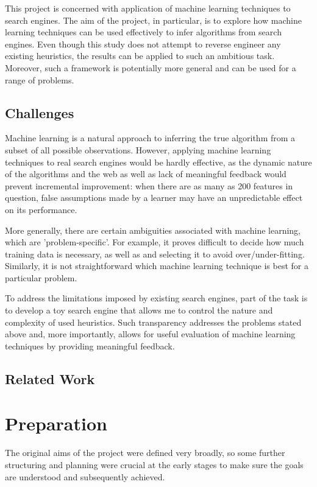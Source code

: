 \documentclass[12pt,notitlepage,twoside]{scrreprt}
\begin{document}
This project is concerned with application of machine learning techniques to
search engines. The aim of the project, in particular,  is to explore how
machine learning techniques can be used effectively to infer algorithms from
search engines. 
Even though this study does not attempt to reverse engineer any existing
heuristics, the results can be applied to such an ambitious task.
Moreover, such a framework is potentially more general and can be used for a
range of problems.

\section{Challenges}
Machine learning is a natural approach to inferring the true algorithm from a
subset of all possible observations. However, applying machine learning
techniques to real search engines would be hardly effective, as the dynamic
nature of the algorithms and the web as well as lack of meaningful feedback
would prevent incremental improvement: when there are as many as 200 features
in question, false assumptions made by a learner may have an unpredictable
effect on its performance.

More generally, there are certain ambiguities associated with machine learning,
which are 'problem-specific'. For example, it proves difficult to decide how
much training data is necessary, as well as and selecting it to avoid
over/under-fitting\cite{domingos}. Similarly, it is not straightforward which
machine learning technique is best for a particular problem.

To address the limitations imposed by existing search engines,
part of the task is to develop a toy search engine that allows me to control
the nature and complexity of used heuristics. Such transparency addresses the
problems stated above and, more importantly,  allows for useful evaluation of
machine learning techniques by providing meaningful feedback.

\section{Related Work}

\cleardoublepage
\chapter{Preparation}
The original aims of the project were defined very broadly, so some further structuring and
planning were crucial at the early stages to make sure the goals are understood and
subsequently achieved.
\end{document}
